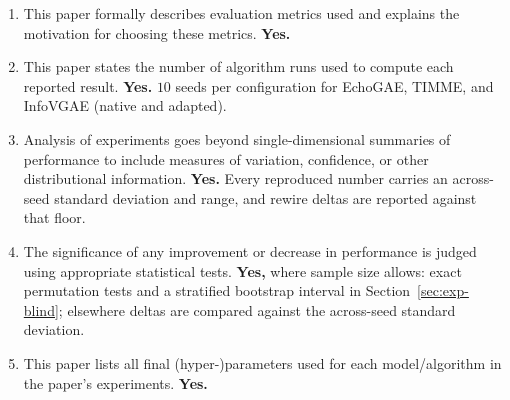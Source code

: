 \documentclass[letterpaper]{article} %
\begin{document}
\begin{enumerate}
\begin{enumerate}
    release.
  \item This paper formally describes evaluation metrics used
    and explains the motivation for choosing these metrics.
    \textbf{Yes.}
  \item This paper states the number of algorithm runs used to
    compute each reported result. \textbf{Yes.} $10$ seeds per
    configuration for EchoGAE, TIMME, and InfoVGAE (native and
    adapted).
  \item Analysis of experiments goes beyond single-dimensional
    summaries of performance to include measures of variation,
    confidence, or other distributional information.
    \textbf{Yes.} Every reproduced number carries an
    across-seed standard deviation and range, and rewire deltas
    are reported against that floor.
  \item The significance of any improvement or decrease in
    performance is judged using appropriate statistical tests.
    \textbf{Yes,} where sample size allows: exact permutation
    tests and a stratified bootstrap interval in
    Section~\ref{sec:exp-blind}; elsewhere deltas are compared
    against the across-seed standard deviation.
  \item This paper lists all final (hyper-)parameters used for
    each model/algorithm in the paper's experiments.
    \textbf{Yes.}
  \end{enumerate}
\end{enumerate}

\appendix


\end{document}
